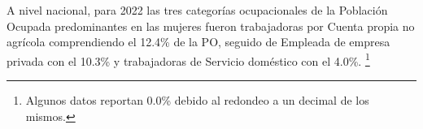  A nivel nacional, para 2022 las tres categorías ocupacionales de la Población Ocupada predominantes en las mujeres fueron trabajadoras por Cuenta propia no agrícola comprendiendo el 12.4\% de la PO, seguido de Empleada de empresa privada con el 10.3\% y trabajadoras de Servicio doméstico con el 4.0\%. \footnote{Algunos datos reportan 0.0\% debido al redondeo a un decimal de los mismos.}

